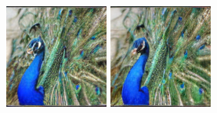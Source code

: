 \begin{figure}[h]
\begin{minipage}{0.15\textwidth}
    \end{minipage}
    \begin{minipage}{0.15\textwidth}
        \centering
        \includegraphics[width=\linewidth]{material/65k/66.png}
    \end{minipage}
    \begin{minipage}{0.15\textwidth}
        \centering
        \includegraphics[width=\linewidth]{material/262k/66.png}
    \end{minipage}


\end{figure}
